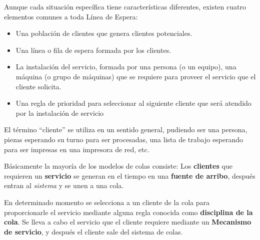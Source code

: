\documentclass{article}
\begin{document}
Aunque cada situación específica tiene características diferentes, existen cuatro elementos comunes a toda Línea de Espera:
\begin{itemize}
    \item Una población de clientes que genera clientes potenciales.

    \item Una línea o fila de espera formada por los clientes.

    \item La instalación del servicio, formada por una persona (o un equipo), una máquina (o grupo de máquinas) que se requiere para proveer el servicio que el cliente solicita.

    \item Una regla de prioridad para seleccionar al siguiente cliente que será atendido por la instalación de servicio
\end{itemize}

El término ``cliente'' se utiliza en un sentido general, pudiendo ser una persona, piezas esperando su turno para ser procesadas, una lista de trabajo esperando para ser impresas en una impresora de red, etc.

Básicamente la mayoría de los modelos de colas consiste: Los \textbf{clientes} que requieren un \textbf{servicio} se generan en el tiempo en una \textbf{fuente de arribo}, después entran al \textit{sistema} y se unen a una cola. 

En determinado momento se selecciona a un cliente de la cola para proporcionarle el servicio mediante alguna regla conocida como \textbf{disciplina de la cola}. Se lleva a cabo el servicio que el cliente requiere mediante un \textbf{Mecanismo de servicio}, y después el cliente sale del sistema de colas.
\end{document}
